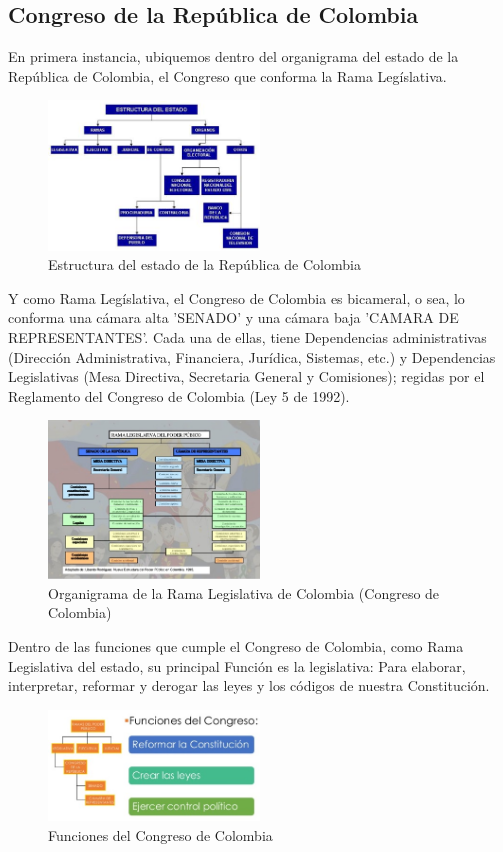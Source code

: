 \documentclass[conference]{IEEEtran}\usepackage[]{graphicx}\usepackage[]{color}
\begin{document}
\subsection{Congreso de la República de Colombia}
En primera instancia, ubiquemos dentro del organigrama del estado de la República de Colombia, el Congreso que conforma la Rama Legíslativa.

\begin{figure}[h]
	\centering
	\includegraphics[width=0.5\textwidth]{EEC2}
	\caption{Estructura del estado de la República de Colombia}
\end{figure}   
Y como Rama Legíslativa, el Congreso de Colombia es bicameral, o sea, lo conforma una cámara alta 'SENADO' y una cámara baja 'CAMARA DE REPRESENTANTES'. Cada una de ellas, tiene Dependencias administrativas (Dirección Administrativa, Financiera, Jurídica, Sistemas, etc.) y Dependencias Legislativas (Mesa Directiva, Secretaria General y Comisiones); regidas por el Reglamento del Congreso de Colombia (Ley 5 de 1992).
\begin{figure}[h]
	\centering
	\includegraphics[width=0.5\textwidth]{RLorga}
	\caption{Organigrama de la Rama Legislativa de Colombia (Congreso de Colombia)}
\end{figure} 
Dentro de las funciones que cumple el Congreso de Colombia, como Rama Legislativa del estado, su principal Función es la legislativa: Para elaborar, interpretar, reformar y derogar las leyes y los códigos de nuestra Constitución.
\begin{figure}[h]
	\centering
	\includegraphics[width=0.5\textwidth]{RLfuncion}
	\caption{Funciones del Congreso de Colombia}
\end{figure}
\end{document}
